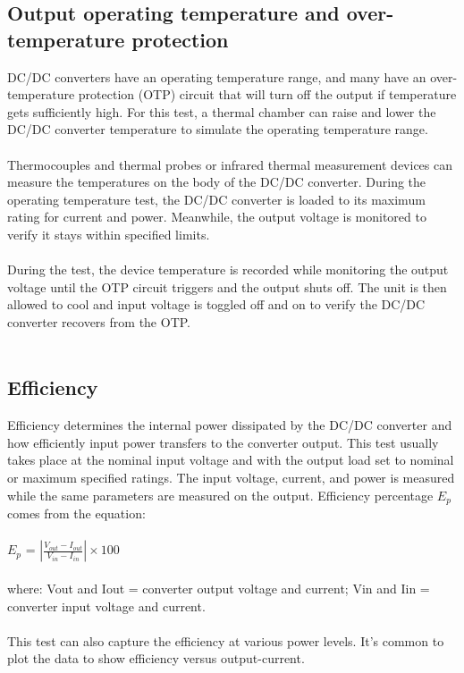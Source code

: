 \subsection{Output operating temperature and over-temperature protection} 

DC/DC converters have an operating temperature range, and many have an over-temperature protection (OTP) circuit that will turn off the output if temperature gets sufficiently high. For this test, a thermal chamber can raise and lower the DC/DC converter temperature to simulate the operating temperature range.
\\ \\
Thermocouples and thermal probes or infrared thermal measurement devices can measure the temperatures on the body of the DC/DC converter. During the operating temperature test, the DC/DC converter is loaded to its maximum rating for current and power. Meanwhile, the output voltage is monitored to verify it stays within specified limits.
\\ \\
During the test, the device temperature is recorded while monitoring the output voltage until the OTP circuit triggers and the output shuts off. The unit is then allowed to cool and input voltage is toggled off and on to verify the DC/DC converter recovers from the OTP.
\\ \\
\subsection{Efficiency} 

Efficiency determines the internal power dissipated by the DC/DC converter and how efficiently input power transfers to the converter output. This test usually takes place at the nominal input voltage and with the output load set to nominal or maximum specified ratings. The input voltage, current, and power is measured while the same parameters are measured on the output. Efficiency percentage $E_{p}$ comes from the equation:
\\ \\
\hspace*{5cm}$E_{p}$ = $\left | \frac{V_{out}-I_{out}}{V_{in}-I_{in}} \right | \times 100$
\\ \\
where:
Vout and Iout = converter output voltage and current;
Vin and Iin = converter input voltage and current.
\\ \\
This test can also capture the efficiency at various power levels. It’s common to plot the data to show efficiency versus output-current.

